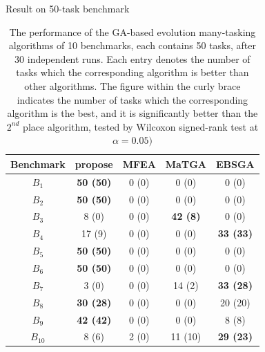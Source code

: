 \begin{frame}{Result on 50-task benchmark}
    \begin{table}[hp]
        \centering
        \begin{tabular}{@{}ccccc@{}}
            \toprule
            \textbf{Benchmark} & \gls{propose} & MFEA & MaTGA & EBSGA \\ \midrule
            $B_1$    & \textbf{50 (50)} & 0 (0) & 0 (0)           & 0 (0) \\
            $B_2$    & \textbf{50 (50)} & 0 (0) & 0 (0)           & 0 (0) \\
            $B_3$    & 8 (0)            & 0 (0) & \textbf{42 (8)} & 0 (0) \\
            $B_4$    & 17 (9)           & 0 (0) & 0 (0)           & \textbf{33 (33)} \\
            $B_5$    & \textbf{50 (50)} & 0 (0) & 0 (0)           & 0 (0) \\
            $B_6$    & \textbf{50 (50)} & 0 (0) & 0 (0)           & 0 (0) \\
            $B_7$    & 3 (0)            & 0 (0) & 14 (2)          & \textbf{33 (28)} \\
            $B_8$    & \textbf{30 (28)} & 0 (0) & 0 (0)           & 20 (20) \\
            $B_9$    & \textbf{42 (42)} & 0 (0) & 0 (0)           & 8 (8) \\
            $B_{10}$ & 8 (6)            & 2 (0) & 11 (10)         & \textbf{29 (23)} \\
            \bottomrule
        \end{tabular}
        \caption{The performance of the GA-based evolution many-tasking algorithms of 10 benchmarks, each contains 50 tasks, after 30 independent runs. Each entry denotes the number of tasks which the corresponding algorithm is better than other algorithms. The figure within the curly brace indicates the number of tasks which the corresponding algorithm is the best, and it is significantly better than the $2^{nd}$ place algorithm, tested by Wilcoxon signed-rank test at $\alpha=0.05 )$}
        \label{tab:last50}
    \end{table}
\end{frame}

